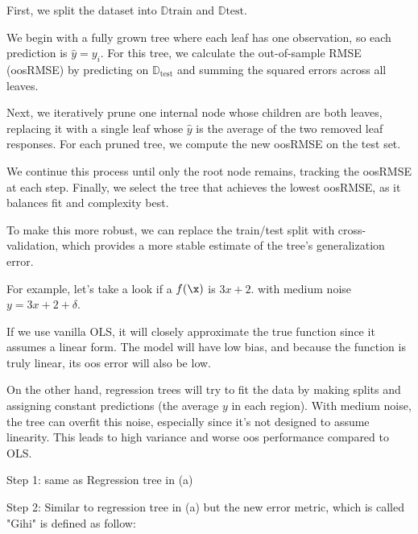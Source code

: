 \documentclass[12pt]{article}
\begin{document}
\begin{enumerate}
First, we split the dataset into $\mathbb{D}{\text{train}}$ and $\mathbb{D}{\text{test}}$.

We begin with a fully grown tree where each leaf has one observation, so each prediction is $\hat{y} = y_i$. For this tree, we calculate the out-of-sample RMSE (oosRMSE) by predicting on $\mathbb{D}_{\text{test}}$ and summing the squared errors across all leaves.

Next, we iteratively prune one internal node whose children are both leaves, replacing it with a single leaf whose $\hat{y}$ is the average of the two removed leaf responses. For each pruned tree, we compute the new oosRMSE on the test set.

We continue this process until only the root node remains, tracking the oosRMSE at each step. Finally, we select the tree that achieves the lowest oosRMSE, as it balances fit and complexity best.

To make this more robust, we can replace the train/test split with cross-validation, which provides a more stable estimate of the tree’s generalization error.





For example, let's take a look if a $f(\x)$ is $3x+2$. with medium noise $y = 3x +2 + \delta$.

If we use vanilla OLS, it will closely approximate the true function since it assumes a linear form. The model will have low bias, and because the function is truly linear, its oos error will also be low.

On the other hand, regression trees will try to fit the data by making splits and assigning constant predictions (the average $y$ in each region). With medium noise, the tree can overfit this noise, especially since it’s not designed to assume linearity. This leads to high variance and worse oos performance compared to OLS.




Step 1: same as Regression tree in (a)

Step 2: Similar to regression tree in (a) but the new error metric, which is called "Gihi" is defined as follow:


\end{enumerate}
\end{document}

